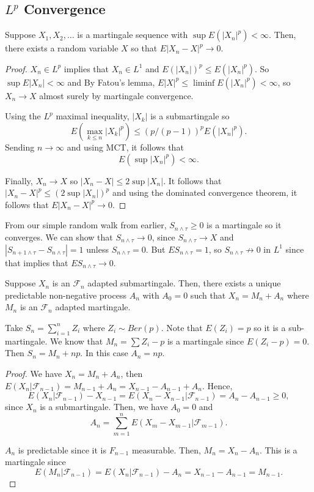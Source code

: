 \documentclass[11pt]{scrartcl}
\let \mc \mathcal
\begin{document}
\subsection{$L^p$ Convergence}
\begin{thm} Suppose $X_1, X_2, \dots$ is a martingale sequence with $\sup E(|X_n|^p) < \infty$.  Then, there exists a random variable $X$ so that $E|X_n - X|^p \to 0$.
\end{thm}
\begin{proof}
$X_n \in L^p$ implies that $X_n \in L^1$ and $E(|X_n|)^p \le E(|X_n|^p)$.  So $\sup E|X_n| < \infty$ and By Fatou's lemma, $E|X|^p \le \liminf E(|X_n|^p) < \infty$, so $X_n \to X$ almost surely by martingale convergence.  

Using the $L^p$ maximal inequality, $|X_k|$ is a submartingale so 
$$E(\max_{k \le n} |X_k|^p) \le (p/(p-1))^p E(|X_n|^p).$$
Sending $n \to \infty$ and using MCT, it follows that 
$$E(\sup |X_n|^p) < \infty.$$

Finally, $X_n \to X$ so $|X_n - X| \le 2\sup |X_n|$. It follows that $|X_n - X|^p \le (2 \sup |X_n|)^p$ and using the dominated convergence theorem, it follows that $E|X_n - X|^p \to 0$.
\end{proof}
\begin{example} From our simple random walk from earlier, $S_{n \wedge \tau} \ge 0$ is a martingale so it converges.  We can show that $S_{n \wedge \tau} \to 0$, since $S_{n \wedge \tau} \to X$ and $|S_{n+1 \wedge \tau} - S_{n \wedge \tau}| = 1$ unless $S_{n \wedge \tau} = 0$.  But $ES_{n \wedge \tau} = 1$, so $S_{n \wedge \tau} \not \to 0$ in $L^1$ since that implies that $ES_{n \wedge \tau} \to 0$.
\end{example}

\begin{thm} Suppose $X_n$ is an $\mc F_n$ adapted submartingale.  Then, there exists a unique predictable non-negative process $A_n$ with $A_0 = 0$ such that $X_n = M_n + A_n$ where $M_n$ is an $\mc F_n$ adapted martingale.
\end{thm}
\begin{example} Take $S_n = \sum_{i=1}^n Z_i$ where $Z_i \sim Ber(p)$.  Note that $E(Z_i) = p$ so it is a sub-martingale.  We know that $M_n = \sum Z_i - p$ is a martingale since $E(Z_i - p) = 0$. Then $S_n = M_n + np$.  In this case $A_n = np$.
\end{example}
\begin{proof}
We have $X_n = M_n + A_n$, then $E(X_n | \mc F_{n-1}) = M_{n-1} + A_n = X_{n-1} - A_{n-1} + A_n$.  Hence,
$$E(X_n|\mc F_{n-1}) - X_{n-1} = E(X_n - X_{n-1}|\mc F_{n-1}) = A_n - A_{n-1} \ge 0,$$
since $X_n$ is a submartingale.  Then, we have $A_0 = 0$ and $$A_n = \sum_{m=1}^n E(X_m - X_{m-1}|\mc F_{m-1}).$$

$A_n$ is predictable since it is $F_{n-1}$ measurable.  Then, $M_n = X_n - A_n$.    This is a martingale since 
$$E(M_n | \mc F_{n-1}) = E(X_n | \mc F_{n-1}) - A_n = X_{n-1} - A_{n-1}= M_{n-1}.$$
\end{proof}
\end{document}
